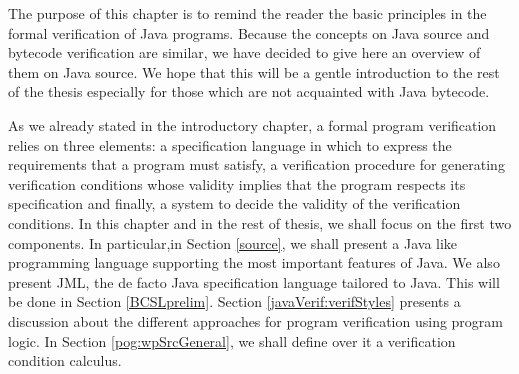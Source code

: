 The purpose of this chapter is to remind the reader the basic principles in the formal verification  
of Java programs. Because the concepts on Java source and bytecode verification are similar, we have decided   
to give here an overview of them on Java source. We hope that this will be a gentle
 introduction to the rest of the thesis especially for  those
which are not acquainted with Java bytecode.

 As we already stated in the introductory chapter, a formal program verification
relies on three elements: a specification language in which to express the requirements 
that a program must satisfy, a verification procedure for generating verification conditions
whose validity implies that the program respects its specification and finally,
 a system to decide the validity of the verification conditions.
In this chapter and in the rest of thesis, we shall focus on the first two components. 
In particular,in Section \ref{source}, we shall present a Java like programming language supporting the most important features of Java.
 We also present JML, the de facto Java specification language  tailored to Java. This will be done in Section \ref{BCSLprelim}. 
Section \ref{javaVerif:verifStyles} presents a discussion about  the different approaches for program verification using program logic.
In Section \ref{pog:wpSrcGeneral}, we shall define over it a  verification condition calculus.
